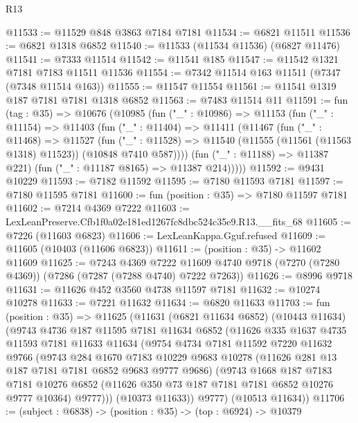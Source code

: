 \begin{lexlean}{R13}
\begin{coremodule}
@11533 := @11529 @848 @3863 @7184 @7181
@11534 := @6821 @11511
@11536 := @6821 @1318 @6852
@11540 := @11533 (@11534 @11536) (@6827 @11476)
@11541 := @7333 @11514
@11542 := @11541 @185
@11547 := @11542 @1321 @7181 @7183 @11511 @11536
@11554 := @7342 @11514 @163 @11511 (@7347 (@7348 @11514 @163))
@11555 := @11547 @11554
@11561 := @11541 @1319 @187 @7181 @7181 @1318 @6852
@11563 := @7483 @11514 @11
@11591 := fun (tag : @35) =>
  @10676
    (@10985
      (fun ("_" : @10986) =>
      @11153
        (fun ("_" : @11154) =>
        @11403
          (fun ("_" : @11404) =>
          @11411
            (@11467
              (fun ("_" : @11468) =>
              @11527
                (fun ("_" : @11528) =>
                @11540 (@11555 (@11561 (@11563 @1318) @11523)) (@10848 @7410 @587))))
            (fun ("_" : @11188) => @11387 @221)
            (fun ("_" : @11187 @8165) => @11387 @214)))))
@11592 := @9431 @10229
@11593 := @7182 @11592
@11595 := @7180 @11593 @7181
@11597 := @7180 @11595 @7181
@11600 := fun (position : @35) => @7180 @11597 @7181
@11602 := @7214 @4369 @7222
@11603 := LexLeanPreserve.Cfb1f0a02e181ed1267fc8dbc524c35e9.R13.__fits_68
@11605 := @7226 (@11603 @6823)
@11606 := LexLeanKappa.Gguf.refused
@11609 := @11605 (@10403 (@11606 @6823))
@11611 := (position : @35) -> @11602 @11609
@11625 := @7243
    @4369
    @7222
    @11609
    @4740
    @9718
    (@7270 (@7280 @4369))
    (@7286 (@7287 (@7288 @4740) @7222 @7263))
@11626 := @8996 @9718
@11631 := @11626 @452 @3560 @4738 @11597 @7181
@11632 := @10274 @10278
@11633 := @7221 @11632
@11634 := @6820 @11633
@11703 := fun (position : @35) =>
  @11625
    (@11631
      (@6821 @11634 @6852)
      (@10443 @11634)
      (@9743
        @4736
        @187
        @11595
        @7181
        @11634
        @6852
        (@11626
          @335
          @1637
          @4735
          @11593
          @7181
          @11633
          @11634
          (@9754
            @4734
            @7181
            @11592
            @7220
            @11632
            @9766
            (@9743
              @284
              @1670
              @7183
              @10229
              @9683
              @10278
              (@11626 @281 @13 @187 @7181 @7181 @6852 @9683 @9777 @9686)
              (@9743
                @1668
                @187
                @7183
                @7181
                @10276
                @6852
                (@11626 @350 @73 @187 @7181 @7181 @6852 @10276 @9777 @10364)
                @9777)))
          (@10373 @11633))
        @9777)
      (@10513 @11634))
@11706 := (subject : @6838) -> (position : @35) -> (top : @6924) -> @10379

\end{coremodule}
\end{lexlean}
